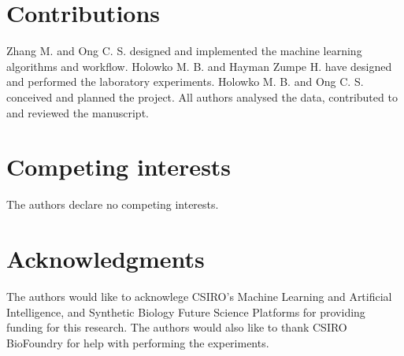 \documentclass{article}
\begin{document}
\section*{Contributions}
Zhang M. and Ong C. S. designed and implemented the machine learning algorithms and workflow. Holowko M. B. and Hayman Zumpe H. have designed and performed the laboratory experiments. Holowko M. B. and Ong C. S. conceived and planned the project. All authors analysed the data, contributed to and reviewed the manuscript.

\section*{Competing interests}
The authors declare no competing interests.

\section*{Acknowledgments}
The authors would like to acknowlege CSIRO's Machine Learning and Artificial Intelligence, and Synthetic Biology Future Science Platforms for providing funding for this research. The authors would also like to thank CSIRO BioFoundry for help with performing the experiments.


\newpage

\printbibliography

\clearpage

\setcounter{figure}{0}
\makeatletter 
\renewcommand{\thefigure}{S\@arabic\c@figure}
\makeatother
\appendix

\end{document}
